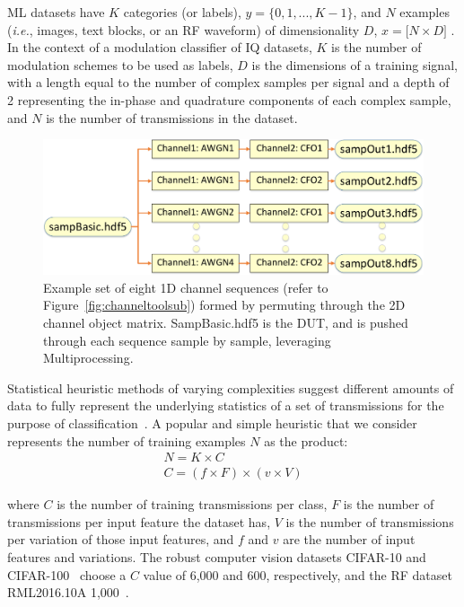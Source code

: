 ML datasets have $K$ categories (or labels), $y = \{0, 1,...,K-1\}$, and $N$ examples (\textit{i.e.}, images, text blocks, or an RF waveform) of dimensionality $D$, $x = \lbrack N \times D \rbrack$ \cite{cs231}. In the context of a modulation classifier of IQ datasets, $K$ is the number of modulation schemes to be used as labels, $D$ is the dimensions of a training signal, with a length equal to the number of complex samples per signal and a depth of 2 representing the in-phase and quadrature components of each complex sample, and $N$ is the number of transmissions in the dataset.

\begin{figure}[ht!]
	\centering	\includegraphics[width=1\textwidth,keepaspectratio]{figs/1d_list_poster.eps}
    \caption{Example set of eight 1D channel sequences (refer to Figure~\ref{fig:channeltoolsub}) formed by permuting through the 2D channel object matrix. SampBasic.hdf5 is the DUT, and is pushed through each sequence sample by sample, leveraging Multiprocessing.} 
\label{fig:1dlist}      
\end{figure}

Statistical heuristic methods of varying complexities suggest different amounts of data to fully represent the underlying statistics of a set of transmissions for the purpose of classification~\cite{75512}. A popular and simple heuristic that we consider represents the number of training examples $N$ as the product:
\vspace{-5mm}
\begin{subequations}
\begin{align}
N = K \times C
\\
C = (f \times F) \times (v \times V)
\end{align}
\end{subequations}


\noindent where $C$ is the number of training transmissions per class, $F$ is the number of transmissions per input feature the dataset has, $V$ is the number of transmissions per variation of those input features, and $f$ and $v$ are the number of input features and variations. The robust computer vision datasets CIFAR-10 and CIFAR-100~\cite{cifar} choose a $C$ value of 6,000 and 600, respectively, and the RF dataset RML2016.10A 1,000~\cite{8054694}.

